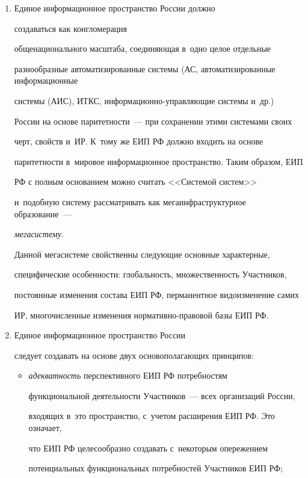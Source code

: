      \begin{enumerate}[1.]

     \item Единое информационное пространство России должно

     создаваться как конгломерация

общенационального масштаба, соединяющая в~одно целое \mbox{отдельные}

разнообразные автоматизированные системы (АС, автоматизированные информационные

сис\-те\-мы (АИС), ИТКС, информационно-управ\-ля\-ющие сис\-те\-мы и~др.)\

России на основе паритетности~--- при сохранении этими системами своих

черт, свойств и~ИР. К~тому же ЕИП РФ должно входить на основе

паритетности в~мировое информационное пространство. Таким образом, ЕИП

РФ с полным основанием можно считать <<Сис\-те\-мой сис\-тем>>

и~подобную систему рассматривать как мегаинфраструктурное образование~---

\textit{мегасистему}.



     Данной мегасистеме свойственны следующие основные характерные,

специфические особенности: глобальность, множественность Участников,

постоянные изменения состава ЕИП РФ, перманентное видоизменение самих

ИР, многочисленные изменения нор\-ма\-тив\-но-пра\-во\-вой базы ЕИП РФ.

     \item Единое информационное пространство России

     следует создавать на основе двух основополагающих принципов:

     \begin{itemize}

\item[(а)] \textit{адекватность} перспективного ЕИП РФ потребностям

функциональной деятельности Участников~--- всех организаций России,

входящих в~это пространство, с~учетом расширения ЕИП РФ. Это означает,

что ЕИП РФ целесообразно создавать с~некоторым опережением

потенциальных функциональных потребностей Участников ЕИП РФ;


\end{itemize}
\end{enumerate}
